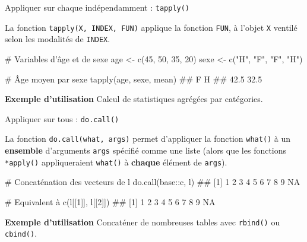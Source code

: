\documentclass[12pt,handout,ignorenonframetext,]{beamer}
\newenvironment{Shaded}{}{}
\newcommand{\KeywordTok}[1]{\textcolor[rgb]{0.00,0.00,1.00}{{#1}}}
\newcommand{\DecValTok}[1]{{#1}}
\newcommand{\StringTok}[1]{\textcolor[rgb]{0.00,0.50,0.50}{{#1}}}
\newcommand{\CommentTok}[1]{\textcolor[rgb]{0.00,0.50,0.00}{{#1}}}
\newcommand{\NormalTok}[1]{{#1}}
\renewenvironment{Shaded}{\begin{snugshade}}{\end{snugshade}}
\begin{document}
\begin{frame}[fragile]{\large Appliquer sur chaque indépendamment :
\texttt{tapply()}}

La fonction \texttt{tapply(X,\ INDEX,\ FUN)} applique la fonction
\texttt{FUN}, à l'objet \texttt{X} ventilé selon les modalités de
\texttt{INDEX}.

\pause 

\begin{Shaded}
\begin{Highlighting}[]
\CommentTok{# Variables d'âge et de sexe}
\NormalTok{age <-}\StringTok{ }\KeywordTok{c}\NormalTok{(}\DecValTok{45}\NormalTok{, }\DecValTok{50}\NormalTok{, }\DecValTok{35}\NormalTok{, }\DecValTok{20}\NormalTok{)}
\NormalTok{sexe <-}\StringTok{ }\KeywordTok{c}\NormalTok{(}\StringTok{"H"}\NormalTok{, }\StringTok{"F"}\NormalTok{, }\StringTok{"F"}\NormalTok{, }\StringTok{"H"}\NormalTok{)}

\CommentTok{# Âge moyen par sexe}
\KeywordTok{tapply}\NormalTok{(age, sexe, mean)}
  \NormalTok{##    F    H }
  \NormalTok{## 42.5 32.5}
\end{Highlighting}
\end{Shaded}

\normalsize \pause

\textbf{Exemple d'utilisation} Calcul de statistiques agrégées par
catégories.

\end{frame}

\begin{frame}[fragile]{\large Appliquer sur tous : \texttt{do.call()}}

La fonction \texttt{do.call(what,\ args)} permet d'appliquer la fonction
\texttt{what()} à un \textbf{ensemble} d'arguments \texttt{args}
spécifié comme une liste (alors que les fonctions \texttt{*apply()}
appliqueraient \texttt{what()} à \textbf{chaque} élément de
\texttt{args}).

\pause \small

\begin{Shaded}
\begin{Highlighting}[]
\CommentTok{# Concaténation des vecteurs de l}
\KeywordTok{do.call}\NormalTok{(base::c, l)}
  \NormalTok{##  [1]  1  2  3  4  5  6  7  8  9 NA}

\CommentTok{# Equivalent à }
\KeywordTok{c}\NormalTok{(l[[}\DecValTok{1}\NormalTok{]], l[[}\DecValTok{2}\NormalTok{]])}
  \NormalTok{##  [1]  1  2  3  4  5  6  7  8  9 NA}
\end{Highlighting}
\end{Shaded}

\pause \normalsize

\textbf{Exemple d'utilisation} Concaténer de nombreuses tables avec
\texttt{rbind()} ou \texttt{cbind()}.

\end{frame}
\end{document}
